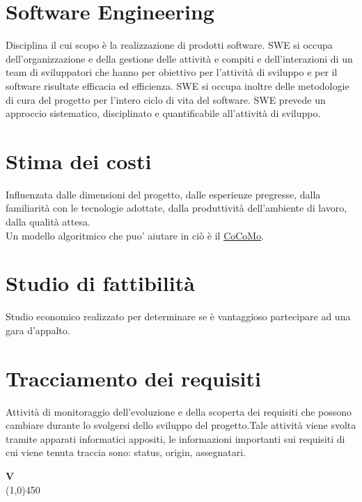 \documentclass[11pt]{article}
\begin{document}
	\section{\LARGE Software Engineering}
	\label{sec:swe}
	Disciplina il cui scopo è la realizzazione di prodotti software.
	SWE si occupa dell'organizzazione e della gestione delle attività e compiti e dell'interazioni di un team di sviluppatori
	che hanno per obiettivo per l'attività di sviluppo e per il software risultate efficacia ed efficienza.	
	SWE si occupa inoltre delle metodologie di cura del progetto per l'intero ciclo di vita del software.
	SWE prevede un approccio sistematico, disciplinato e quantificabile all'attività di sviluppo.

	\section{\LARGE Stima dei costi}
	\label{sec:stimacosti}
	Influenzata dalle dimensioni del progetto, dalle esperienze pregresse, dalla familiarità con le tecnologie adottate, dalla produttività dell'ambiente di lavoro, dalla qualità attesa. \\Un modello algoritmico che puo' aiutare in ciò è il \hyperref[sec:cocomo]{CoCoMo}.

	\section{\LARGE Studio di fattibilità}
	\label{sec:studiofattibilita}
	Studio economico realizzato per determinare se è vantaggioso partecipare ad una gara d'appalto.\newpage

	\section{\LARGE Tracciamento dei requisiti}
	\label{sec:tracciamentorequisiti}
	Attività di monitoraggio dell'evoluzione e della scoperta dei requisiti che possono cambiare durante lo svolgersi dello sviluppo del progetto.Tale attività viene svolta tramite apparati informatici appositi, le informazioni importanti sui requisiti di cui viene tenuta traccia sono: status, origin, assegnatari.\newpage

	{\Huge{\textbf{V}}} \\
	\line(1,0){450}
	
\end{document}

